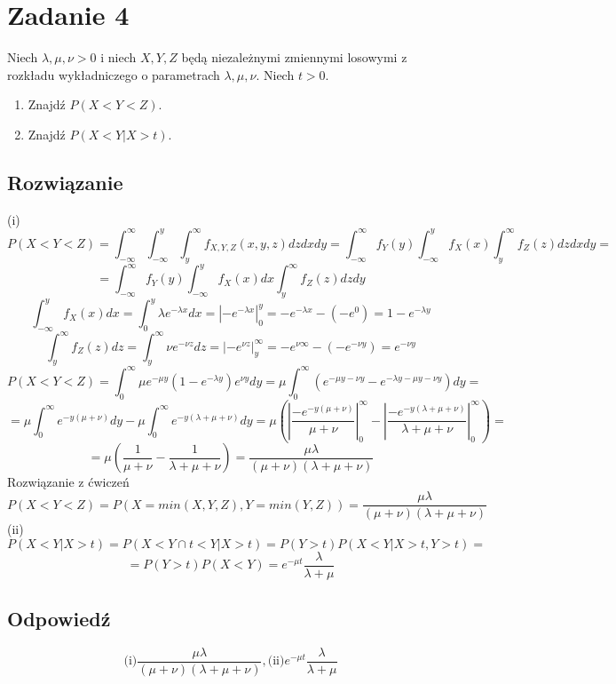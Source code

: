 \section{Zadanie 4}
Niech \(\lambda, \mu, \nu > 0\) i niech \(X,Y,Z\) będą niezależnymi zmiennymi losowymi z
rozkładu wykładniczego o parametrach \(\lambda, \mu, \nu\). Niech \(t > 0\).
\begin{enumerate}[label=(\roman*)]
	\item Znajdź \(P(X < Y < Z)\).
	\item Znajdź \(P(X < Y|X > t)\).
\end{enumerate}

\subsection*{Rozwiązanie}
(i)\[P(X < Y < Z) = \int_{-\infty}^{\infty}\int_{-\infty}^{y}\int_{y}^{\infty}f_{X,Y,Z}(x,y,z)dzdxdy = \int_{-\infty}^{\infty}f_{Y}(y)\int_{-\infty}^{y}f_{X}(x)\int_{y}^{\infty}f_{Z}(z)dzdxdy = \]
\[ = \int_{-\infty}^{\infty}f_{Y}(y)\int_{-\infty}^{y}f_{X}(x)dx\int_{y}^{\infty}f_{Z}(z)dzdy\]
\[\int_{-\infty}^{y}f_{X}(x)dx = \int_{0}^{y}\lambda e^{-\lambda x}dx = \left|{-e^{-\lambda x}}\right|_{0}^{y} = -e^{-\lambda x} - (-e^{0}) = 1 - e^{-\lambda y}\]
\[\int_{y}^{\infty}f_{Z}(z)dz = \int_{y}^{\infty}\nu e^{-\nu z}dz = \left|{-e^{\nu z}}\right|_{y}^{\infty} = -e^{\nu\infty} - (-e^{-\nu y}) = e^{-\nu y}\]
\[P(X < Y < Z) = \int_{0}^{\infty}\mu e^{-\mu y}(1 - e^{-\lambda y})e^{\nu y}dy = \mu\int_{0}^{\infty}(e^{-\mu y - \nu y} - e^{-\lambda y - \mu y - \nu y})dy =\]
\[= \mu\int_{0}^{\infty}e^{-y(\mu+\nu)}dy - \mu\int_{0}^{\infty}e^{-y(\lambda + \mu + \nu)}dy = \mu\left(\left|\frac{-e^{-y(\mu + \nu)}}{\mu + \nu}\right|_{0}^{\infty} - \left|\frac{-e^{-y(\lambda + \mu + \nu)}}{\lambda + \mu + \nu}\right|_{0}^{\infty}\right) = \]
\[= \mu\left(\frac{1}{\mu + \nu} - \frac{1}{\lambda + \mu + \nu}\right) = \frac{\mu\lambda}{(\mu + \nu)(\lambda + \mu + \nu)}\]
Rozwiązanie z ćwiczeń
\[P(X < Y < Z) = P(X = min(X,Y,Z), Y = min(Y, Z)) = \frac{\mu\lambda}{(\mu + \nu)(\lambda + \mu + \nu)}\]
(ii)
\[P(X < Y|X > t) = P(X < Y \cap t < Y|X > t) = P(Y > t)P(X < Y|X > t, Y > t) =\]
\[ = P(Y > t)P(X < Y) = e^{-\mu t}\frac{\lambda}{\lambda + \mu}\]
\subsection*{Odpowiedź}
\[
	\boxed{\text{(i)}\frac{\mu\lambda}{(\mu + \nu)(\lambda + \mu + \nu)}, \text{(ii)}e^{-\mu t}\frac{\lambda}{\lambda + \mu}}
\]
